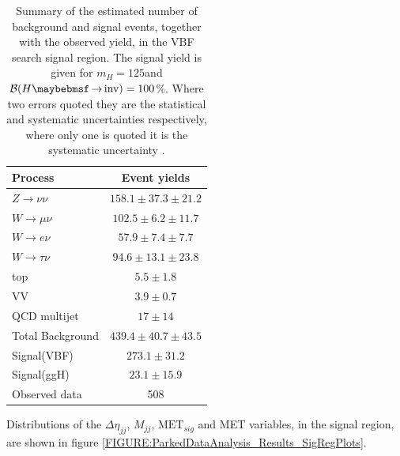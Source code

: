 \begin{table}[!htb]
\centering
\begin{tabular}{|l|c|}
\hline 
Process & Event yields \\
\hline\hline
$Z\rightarrow\nu\nu$  & $158.1 \pm 37.3 \pm 21.2$ \\
$W\rightarrow\mu\nu$  & $102.5 \pm 6.2  \pm 11.7$ \\
$W\rightarrow e\nu$   & $ 57.9 \pm 7.4  \pm  7.7$ \\
$W\rightarrow\tau\nu$ & $ 94.6 \pm 13.1 \pm 23.8$ \\
top                   & $  5.5 \pm 1.8$           \\ 
VV                    & $  3.9 \pm 0.7$           \\ 
QCD multijet          & $   17 \pm 14$            \\
\hline\hline
Total Background      & $439.4 \pm 40.7 \pm 43.5$ \\
\hline\hline
Signal(VBF)           & $273.1 \pm 31.2 $         \\   
Signal(ggH)           & $ 23.1 \pm 15.9 $         \\   
\hline\hline
Observed data         & 508                       \\
\hline
\end{tabular}
\caption{Summary of the estimated number of background and signal events, together with the observed yield, in the \gls{VBF} search signal region. The signal yield is given for $m_H=125$\GeV and $\BRinv=100$\%. Where two errors quoted they are the statistical and systematic uncertainties respectively, where only one is quoted it is the systematic uncertainty \cite{ARTICLE:CMSVBFHiggsInvisibleParkedAnalysisPAS}.}
\label{TABLE:ParkedDataAnalysis_Results_Summary}
\end{table}

Distributions of the $\Delta\eta_{jj}$, $M_{jj}$, $\text{MET}_{sig}$ and \gls{MET} variables, in the signal region, are shown in figure \ref{FIGURE:ParkedDataAnalysis_Results_SigRegPlots}. 

